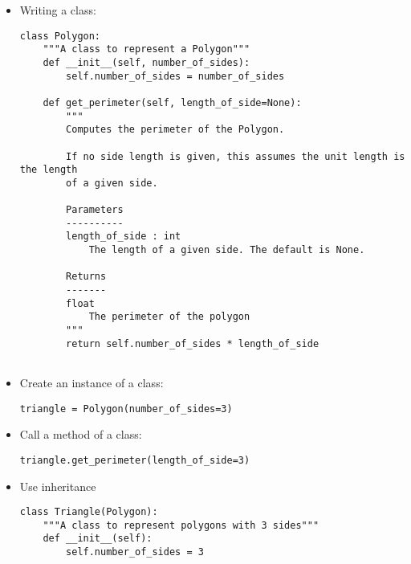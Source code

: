 \documentclass{article}
\begin{document}
\begin{itemize}
\item
  Writing a class:

        \begin{verbatim}
class Polygon:
    """A class to represent a Polygon"""
    def __init__(self, number_of_sides):
        self.number_of_sides = number_of_sides

    def get_perimeter(self, length_of_side=None):
        """
        Computes the perimeter of the Polygon.

        If no side length is given, this assumes the unit length is the length
        of a given side.

        Parameters
        ----------
        length_of_side : int
            The length of a given side. The default is None.

        Returns
        -------
        float
            The perimeter of the polygon
        """
        return self.number_of_sides * length_of_side
        
        \end{verbatim}


\item
Create an instance of a class:

        \begin{verbatim}
triangle = Polygon(number_of_sides=3)
        \end{verbatim}

\item
Call a method of a class:

        \begin{verbatim}
triangle.get_perimeter(length_of_side=3)
        \end{verbatim}


\item
  Use inheritance

        \begin{verbatim}
class Triangle(Polygon):
    """A class to represent polygons with 3 sides"""
    def __init__(self):
        self.number_of_sides = 3
        \end{verbatim}

\end{itemize}
\end{document}

